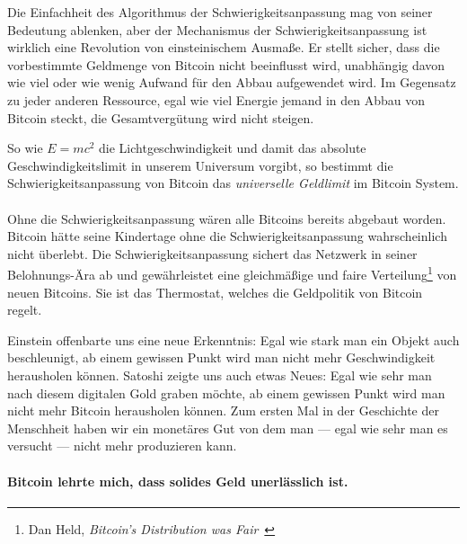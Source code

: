 Die Einfachheit des Algorithmus der Schwierigkeitsanpassung mag von seiner
Bedeutung  ablenken, aber der Mechanismus der Schwierigkeitsanpassung ist
wirklich eine Revolution von einsteinischem Ausmaße. Er stellt sicher, dass
die vorbestimmte Geldmenge von Bitcoin nicht beeinflusst wird, unabhängig davon
wie viel oder wie wenig Aufwand für den Abbau aufgewendet wird. Im Gegensatz zu
jeder anderen Ressource, egal wie viel Energie jemand in den Abbau von Bitcoin
steckt, die Gesamtvergütung wird nicht steigen.

So wie $E=mc^2$ die Lichtgeschwindigkeit und damit das absolute
Geschwindigkeitslimit in unserem Universum vorgibt, so bestimmt die
Schwierigkeitsanpassung von Bitcoin das \textit{universelle Geldlimit} im
Bitcoin System.

\paragraph{}
Ohne die Schwierigkeitsanpassung wären alle Bitcoins bereits abgebaut worden.
Bitcoin hätte seine Kindertage ohne die Schwierigkeitsanpassung wahrscheinlich
nicht überlebt. Die Schwierigkeitsanpassung sichert das Netzwerk in seiner
Belohnungs-Ära ab und gewährleistet eine gleichmäßige und faire
Verteilung\footnote{Dan Held, \textit{Bitcoin's Distribution was
Fair}~\cite{distribution-was-fair}} von neuen Bitcoins. Sie ist das Thermostat,
welches die Geldpolitik von Bitcoin regelt.

Einstein offenbarte uns eine neue Erkenntnis: Egal wie stark man ein Objekt auch
beschleunigt, ab einem gewissen Punkt wird man nicht mehr Geschwindigkeit
herausholen können. Satoshi zeigte uns auch etwas Neues: Egal wie sehr man nach
diesem digitalen Gold graben möchte, ab einem gewissen Punkt wird man nicht mehr
Bitcoin herausholen können. Zum ersten Mal in der Geschichte der Menschheit
haben wir ein monetäres Gut von dem man --- egal wie sehr man es versucht ---
nicht mehr produzieren kann.

\paragraph{Bitcoin lehrte mich, dass solides Geld unerlässlich ist.}

